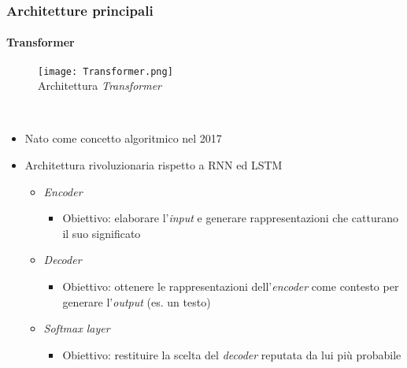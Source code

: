 \begin{frame}[t] \frametitle{Architetture principali}
\framesubtitle{Transformer}
{\scriptsize
{}
	\begin{minipage}[t]{\textwidth}
		\vspace*{-.5cm}
		\begin{figure}
			\centering
			\texttt{[image: Transformer.png]}
			\\Architettura \emph{Transformer}
		\end{figure}
	\end{minipage}
	\\\vspace*{.3cm}
	\begin{minipage}[t]{\textwidth}
		\begin{itemize}[leftmargin=10pt,align=right]
			\item[\alert{\faArrowCircleRight}] Nato come concetto algoritmico nel 2017
			\onslide<1->\item[\alert{\faArrowCircleRight}] Architettura rivoluzionaria rispetto a RNN ed LSTM
			\begin{itemize}[leftmargin=10pt,align=right]
				\onslide<2->\item[\alert{\faArrowCircleRight}] \alert{\emph{Encoder}}
				\begin{itemize}[leftmargin=10pt,align=right]
					\item[\alert{\faArrowCircleRight}] \alert{Obiettivo:} elaborare l'\emph{input} e generare rappresentazioni che catturano il suo significato
				\end{itemize}
				\item[\alert{\faArrowCircleRight}] \alert{\emph{Decoder}}
				\begin{itemize}[leftmargin=10pt,align=right]
					\item[\alert{\faArrowCircleRight}] \alert{Obiettivo:} ottenere le rappresentazioni dell'\emph{encoder} come \alert{contesto} per generare l'\emph{output} (es. un testo)
				\end{itemize}
				\item[\alert{\faArrowCircleRight}] \alert{\emph{Softmax layer}}
				\begin{itemize}[leftmargin=10pt,align=right]
					\item[\alert{\faArrowCircleRight}] \alert{Obiettivo:} restituire la scelta del \emph{decoder} reputata da lui più probabile
				\end{itemize}
			\end{itemize}
		\end{itemize}
	\end{minipage}
}
\end{frame}
